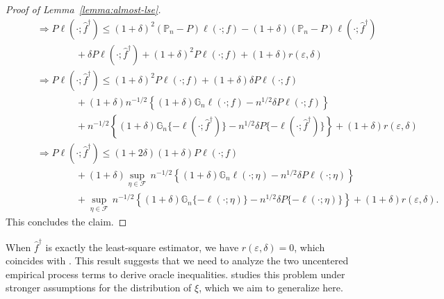 \documentclass[12pt]{article}
\begin{document}
\begin{appendices}
\begin{proof}[Proof of Lemma~\ref{lemma:almost-lse}]
\begin{align}
		&\qquad \Longrightarrow P \ell(\cdot; \widehat f^\dag) \le (1+\delta)^2(\mathbb{P}_n-P) \ell(\cdot; f) - (1+\delta)(\mathbb{P}_n-P) \ell(\cdot; \widehat f^\dag)\nonumber \\
		&\qquad\qquad\qquad+\delta P \ell(\cdot; \widehat f^\dag) + (1+\delta)^2P\ell(\cdot; f)+ (1+\delta)r(\varepsilon, \delta)\nonumber\\
		&\qquad\Longrightarrow P \ell(\cdot; \widehat f^\dag)  \le (1+\delta)^2P\ell(\cdot; f) + (1+\delta)\delta P \ell(\cdot; f) \nonumber \\
        &\qquad \qquad\qquad+ (1+\delta)n^{-1/2}\left\{(1+\delta)\mathbb{G}_n \ell(\cdot; f)-n^{1/2}\delta P \ell(\cdot; f)\right\} \nonumber\\
		&\qquad \qquad \qquad +n^{-1/2}\left\{(1+\delta)\mathbb{G}_n \{-\ell(\cdot; \widehat f^\dag)\}-n^{1/2}\delta P \{-\ell(\cdot; \widehat f^\dag)\}\right\}+ (1+\delta)r(\varepsilon, \delta)\nonumber\\
		&\qquad\Longrightarrow P \ell(\cdot; \widehat f^\dag)  \le (1+2\delta)(1+\delta)P\ell(\cdot; f) \nonumber\\
        &\qquad\qquad\qquad+ (1+\delta)\sup_{\eta\in\mathcal{F}}\, n^{-1/2}\left\{(1+\delta)\mathbb{G}_n \ell(\cdot; \eta)-n^{1/2}\delta P \ell(\cdot; \eta)\right\} \nonumber\\
		&\qquad \qquad \qquad +\sup_{\eta\in\mathcal{F}}\, n^{-1/2}\left\{(1+\delta)\mathbb{G}_n \{-\ell(\cdot;  \eta)\}-n^{1/2}\delta P \{-\ell(\cdot; \eta)\}\right\}+ (1+\delta)r(\varepsilon, \delta)\nonumber.
	\end{align}
        This concludes the claim.
\end{proof}


When $\widehat f^\dag$ is exactly the least-square estimator, we have $r(\varepsilon, \delta)=0$, which coincides with \citep[Lemma~2.1]{vaart2006oracle}. This result suggests that we need to analyze the two uncentered empirical process terms to derive oracle inequalities. \cite{vaart2006oracle} studies this problem under stronger assumptions for the distribution of $\xi$, which we aim to generalize here.


\end{appendices}
\end{document}
